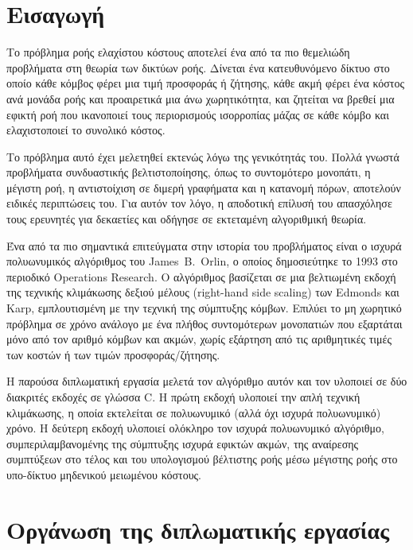 \documentclass[11pt,a4paper,oneside]{report}
\begin{document}
\section{Εισαγωγή}

Το πρόβλημα ροής ελαχίστου κόστους αποτελεί ένα από τα πιο θεμελιώδη προβλήματα στη θεωρία των δικτύων ροής. Δίνεται ένα κατευθυνόμενο δίκτυο στο οποίο κάθε κόμβος φέρει μια τιμή προσφοράς ή ζήτησης, κάθε ακμή φέρει ένα κόστος ανά μονάδα ροής και προαιρετικά μια άνω χωρητικότητα, και ζητείται να βρεθεί μια εφικτή ροή που ικανοποιεί τους περιορισμούς ισορροπίας μάζας σε κάθε κόμβο και ελαχιστοποιεί το συνολικό κόστος.

Το πρόβλημα αυτό έχει μελετηθεί εκτενώς λόγω της γενικότητάς του. Πολλά γνωστά προβλήματα συνδυαστικής βελτιστοποίησης, όπως το συντομότερο μονοπάτι, η μέγιστη ροή, η αντιστοίχιση σε διμερή γραφήματα και η κατανομή πόρων, αποτελούν ειδικές περιπτώσεις του. Για αυτόν τον λόγο, η αποδοτική επίλυσή του απασχόλησε τους ερευνητές για δεκαετίες και οδήγησε σε εκτεταμένη αλγοριθμική θεωρία.

Ένα από τα πιο σημαντικά επιτεύγματα στην ιστορία του προβλήματος είναι ο ισχυρά πολυωνυμικός αλγόριθμος του \textenglish{James~B.~Orlin}, ο οποίος δημοσιεύτηκε το 1993 στο περιοδικό \textenglish{Operations Research}. Ο αλγόριθμος βασίζεται σε μια βελτιωμένη εκδοχή της τεχνικής κλιμάκωσης δεξιού μέλους (\textenglish{right-hand side scaling}) των \textenglish{Edmonds} και \textenglish{Karp}, εμπλουτισμένη με την τεχνική της σύμπτυξης κόμβων. Επιλύει το μη χωρητικό πρόβλημα σε χρόνο ανάλογο με ένα πλήθος συντομότερων μονοπατιών που εξαρτάται μόνο από τον αριθμό κόμβων και ακμών, χωρίς εξάρτηση από τις αριθμητικές τιμές των κοστών ή των τιμών προσφοράς/ζήτησης.

Η παρούσα διπλωματική εργασία μελετά τον αλγόριθμο αυτόν και τον υλοποιεί σε δύο διακριτές εκδοχές σε γλώσσα \textenglish{C}. Η πρώτη εκδοχή υλοποιεί την απλή τεχνική κλιμάκωσης, η οποία εκτελείται σε πολυωνυμικό (αλλά όχι ισχυρά πολυωνυμικό) χρόνο. Η δεύτερη εκδοχή υλοποιεί ολόκληρο τον ισχυρά πολυωνυμικό αλγόριθμο, συμπεριλαμβανομένης της σύμπτυξης ισχυρά εφικτών ακμών, της αναίρεσης συμπτύξεων στο τέλος και του υπολογισμού βέλτιστης ροής μέσω μέγιστης ροής στο υπο-δίκτυο μηδενικού μειωμένου κόστους.

\section{Οργάνωση της διπλωματικής εργασίας}
\end{document}

